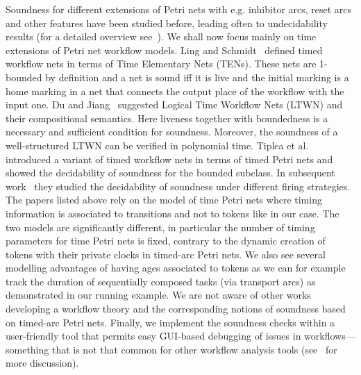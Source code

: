 Soundness for different extensions of Petri nets with e.g. 
inhibitor arcs, reset arcs and other features have been studied before,
leading often to undecidability results (for a detailed overview 
see~\cite{AalstHHSVVW11}). We shall now focus mainly on 
time extensions of Petri net workflow models.
Ling and Schmidt~\cite{LS2000} defined timed workflow nets in terms 
of Time Elementary Nets (TENs). These nets are 1-bounded by definition 
and a net is sound iff it is live and the initial marking is a
home marking in a net that connects the output place of the workflow with
the input one. Du and Jiang~\cite{DuJ03} suggested Logical Time Workflow Nets 
(LTWN) and their compositional semantics. Here liveness together with 
boundedness is a necessary and sufficient condition for soundness.
Moreover, the soundness of a well-structured LTWN can be verified 
in polynomial time. Tiplea et al.~\cite{TipleaM05} 
introduced a variant of timed workflow nets in terms of timed Petri nets 
and showed the decidability of soundness for the bounded subclass.
In subsequent work~\cite{TipleaM06,TipleaM09} they studied the decidability 
of soundness under different firing strategies. The papers listed above
rely on the model of time Petri nets where timing information is
associated to transitions and not to tokens like in our case.
The two models are significantly different, in particular the 
number of timing parameters for time Petri nets is fixed, contrary
to the dynamic creation of tokens with their private clocks in
timed-arc Petri nets. We also see several modelling advantages
of having ages associated to tokens as we can for example track
the duration of sequentially composed tasks (via transport arcs) 
as demonstrated in our running example. We are not aware of other
works developing a workflow theory and the corresponding notions
of soundness based on timed-arc Petri nets. Finally, we
implement the soundness checks within a user-friendly tool
that permits easy GUI-based debugging of issues in workflows---something 
that is not that common for other workflow analysis tools 
(see~\cite{FF:AWPN:06} for more discussion).
